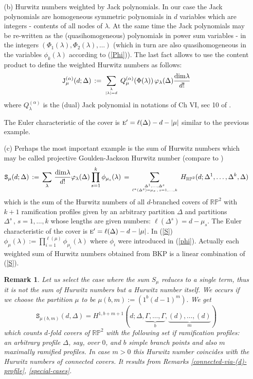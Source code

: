 \documentclass[a4paper,10pt]{article}
\theoremstyle{plain}
\newtheorem{Remark}{Remark}
\theoremstyle{remark}
\def\be{\begin{equation}}
\def\ee{\end{equation}}
\def\br{\begin{Remark}\rm\small}
\def\er{\end{Remark}}
\begin{document}
(b) Hurwitz numbers weighted by Jack polynomials. In our case the Jack polynomials are homogeneous symmetric polynomials in $d$ variables
which are integers - contents of all nodes of $\lambda$.
At the same time the Jack polynomials may be re-written as the (quasihomogeneous) polynomials in power sum variables -
in the integers
$(\Phi_1(\lambda),\Phi_2(\lambda),\dots)$ (which in turn are also quasihomogeneous in the variables $\phi_k(\lambda)$ according to (\ref{Phi})).
The last fact allows to use the content product to define the weighted Hurwitz numbers as follows:
\be\label{texttt-J}
\texttt{J}^{(\alpha)}_{\mu}(d;\Delta)\, :=\,\sum_{\lambda\atop |\lambda|=d}\,
Q^{(\alpha)}_\mu(\Phi(\lambda))\, \varphi_\lambda(\Delta)\frac{{\rm dim}\lambda}{d!}
\ee
where $Q^{(\alpha)}_\lambda$ is the (dual) Jack polynomial in notations of Ch VI, sec 10 of \cite{Mac}.


The Euler characteristic of the cover is $\textsc{e}'= \ell(\Delta)-d-|\mu|$ similar to the previous example.

(c) Perhaps the most important example is the sum of Hurwitz numbers which may be called
projective Goulden-Jackson Hurwitz number (compare to \cite{Goulden-Jackson-2008})
\be\label{S}
\texttt{S}_\mu(d;\Delta) \, :=\,
\sum_\lambda\, \frac{{\rm dim}\lambda}{d!} \varphi_\lambda(\Delta)
\prod_{s=1}^k\phi_{\mu_s}(\lambda)\,
 =\sum_{\Delta^1,\dots,\Delta^s\atop \ell^*(\Delta^{s})=\mu_s\,,\, s=1,\dots,k}\,
 H_{\mathbb{RP}^2}(d; \Delta^{1},\dots,\Delta^{k},\Delta)
\ee
which is the sum of the Hurwitz numbers of all $d$-branched covers of $\mathbb{RP}^2$ with $k+1$ ramification profiles
given by an arbitrary partition $\Delta$ and  partitions $\Delta^s\,,\,s=1,\dots,k$ whose lengths are given numbers:
$\ell(\Delta^s)=d-\mu_s$.  The Euler characteristic of the cover is $\textsc{e}'=\ell(\Delta)-d-|\mu|$.
In (\ref{S}) $\phi_\mu(\lambda):=\prod_{i=1}^{\ell(\mu)} \phi_{\mu_i}(\lambda)$ where $\phi_i$ were introduced in (\ref{phi}).
Actually each weighted sum of Hurwitz numbers obtained from BKP is a linear combination of (\ref{S}).

\br\label{simple+maximally-ramified} Let us select the case where the sum $S_\mu$ reduces to a single term, thus it is not the sum
of Hurwitz numbers but a Hurwitz number itself. We occurs if we choose the partition $\mu$ to be $\mu(b,m):=(1^{b}(d-1)^{m})$. We get
\be
\texttt{S}_{\mu(b,m)}(d,\Delta)=H^{1,b+m+1}(d;\Delta,\underbrace{ \Gamma,\dots,\Gamma}_b,\underbrace{(d),\dots,(d)}_m)
\ee
which counts $d$-fold covers of $\mathbb{RP}^2$ with the following set if ramification profiles: an arbitrary profile $\Delta$, say,
over $0$, and $b$ simple branch points and also $m$ maximally ramified profiles. In case $m>0$ this Hurwitz number coincides with the Hurwitz
numbers of connected covers. It results from Remarks \ref{connected-via-(d)-profile}, \ref{special-cases}.
\er
\end{document}
